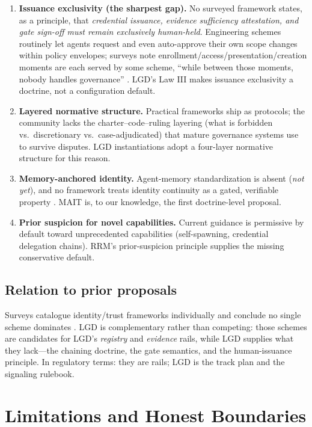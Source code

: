 \documentclass[12pt]{article}
\begin{document}
\begin{enumerate}[itemsep=2pt]
  \item \textbf{Issuance exclusivity (the sharpest gap).} No surveyed framework states, as a principle, that \emph{credential issuance, evidence sufficiency attestation, and gate sign-off must remain exclusively human-held}. Engineering schemes routinely let agents request and even auto-approve their own scope changes within policy envelopes; surveys note enrollment/access/presentation/creation moments are each served by some scheme, ``while between those moments, nobody handles governance'' \cite{survey2508}. LGD's Law III makes issuance exclusivity a doctrine, not a configuration default.
  \item \textbf{Layered normative structure.} Practical frameworks ship as protocols; the community lacks the charter--code--ruling layering (what is forbidden vs.\ discretionary vs.\ case-adjudicated) that mature governance systems use to survive disputes. LGD instantiations adopt a four-layer normative structure for this reason.
  \item \textbf{Memory-anchored identity.} Agent-memory standardization is absent (\emph{not yet}), and no framework treats identity continuity as a gated, verifiable property \cite{memorystandard}. MAIT is, to our knowledge, the first doctrine-level proposal.
  \item \textbf{Prior suspicion for novel capabilities.} Current guidance is permissive by default toward unprecedented capabilities (self-spawning, credential delegation chains). RRM's prior-suspicion principle supplies the missing conservative default.
\end{enumerate}

\subsection{Relation to prior proposals}

Surveys catalogue identity/trust frameworks individually and conclude no single scheme dominates \cite{survey2508,survey2604}. LGD is complementary rather than competing: those schemes are candidates for LGD's \emph{registry} and \emph{evidence} rails, while LGD supplies what they lack---the chaining doctrine, the gate semantics, and the human-issuance principle. In regulatory terms: they are rails; LGD is the track plan and the signaling rulebook.

\section{Limitations and Honest Boundaries}\label{sec:limits}
\end{document}
